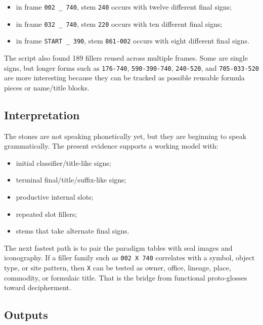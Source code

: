 \begin{itemize}
  \item in frame \texttt{002 \_ 740}, stem \texttt{240} occurs with twelve different final signs;
  \item in frame \texttt{032 \_ 740}, stem \texttt{220} occurs with ten different final signs;
  \item in frame \texttt{START \_ 390}, stem \texttt{861-002} occurs with eight different final signs.
\end{itemize}

The script also found 189 fillers reused across multiple frames. Some are single signs, but longer forms such as \texttt{176-740}, \texttt{590-390-740}, \texttt{240-520}, and \texttt{705-033-520} are more interesting because they can be tracked as possible reusable formula pieces or name/title blocks.

\subsection{Interpretation}

The stones are not speaking phonetically yet, but they are beginning to speak grammatically. The present evidence supports a working model with:

\begin{itemize}
  \item initial classifier/title-like signs;
  \item terminal final/title/suffix-like signs;
  \item productive internal slots;
  \item repeated slot fillers;
  \item stems that take alternate final signs.
\end{itemize}

The next fastest path is to pair the paradigm tables with seal images and iconography. If a filler family such as \texttt{002 X 740} correlates with a symbol, object type, or site pattern, then \texttt{X} can be tested as owner, office, lineage, place, commodity, or formulaic title. That is the bridge from functional proto-glosses toward decipherment.

\subsection{Outputs}

